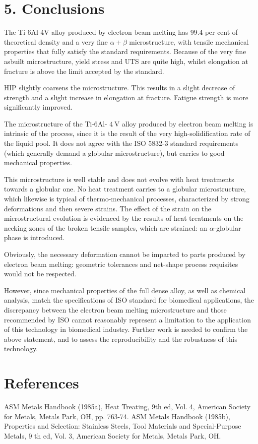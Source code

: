 \documentclass[10pt]{article}
\begin{document}
\section*{5. Conclusions}
The Ti-6Al-4V alloy produced by electron beam melting has 99.4 per cent of theoretical density and a very fine $\alpha+\beta$ microstructure, with tensile mechanical properties that fully satisfy the standard requirements. Because of the very fine asbuilt microstructure, yield stress and UTS are quite high, whilst elongation at fracture is above the limit accepted by the standard.

HIP slightly coarsens the microstructure. This results in a slight decrease of strength and a slight increase in elongation at fracture. Fatigue strength is more significantly improved.

The microstructure of the Ti-6Al- $4 \mathrm{~V}$ alloy produced by electron beam melting is intrinsic of the process, since it is the result of the very high-solidification rate of the liquid pool. It does not agree with the ISO 5832-3 standard requirements (which generally demand a globular microstructure), but carries to good mechanical properties.

This microstructure is well stable and does not evolve with heat treatments towards a globular one. No heat treatment carries to a globular microstructure, which likewise is typical of thermo-mechanical processes, characterized by strong deformations and then severe strains. The effect of the strain on the microstructural evolution is evidenced by the results of heat treatments on the necking zones of the broken tensile samples, which are strained: an $\alpha$-globular phase is introduced.

Obviously, the necessary deformation cannot be imparted to parts produced by electron beam melting: geometric tolerances and net-shape process requisites would not be respected.

However, since mechanical properties of the full dense alloy, as well as chemical analysis, match the specifications of ISO standard for biomedical applications, the discrepancy between the electron beam melting microstructure and those recommended by ISO cannot reasonably represent a limitation to the application of this technology in biomedical industry. Further work is needed to confirm the above statement, and to assess the reproducibility and the robustness of this technology.

\section*{References}
ASM Metals Handbook (1985a), Heat Treating, 9th ed, Vol. 4, American Society for Metals, Metals Park, OH, pp. 763-74. ASM Metals Handbook (1985b), Properties and Selection: Stainless Steels, Tool Materials and Special-Purpose Metals, 9 th ed, Vol. 3, American Society for Metals, Metals Park, OH.
\end{document}
